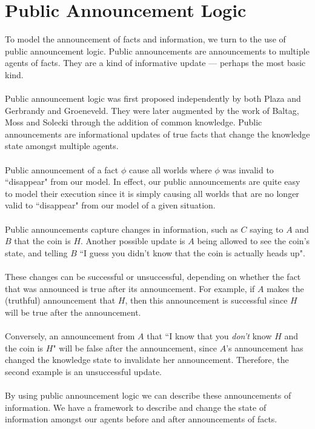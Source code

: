 \documentclass[10pt, a4paper, twoside]{article}
\begin{document}
\section{Public Announcement Logic}\label{pal}
To model the announcement of facts and information, we turn to the use of public
announcement logic.
Public announcements are announcements to multiple agents of facts.
They are a kind of informative update --- perhaps the most basic kind.\\
\\
Public announcement logic was first proposed independently by both Plaza and
Gerbrandy and Groeneveld.
They were later augmented by the work of Baltag, Moss and Solecki through the
addition of common knowledge.
Public announcements are informational updates of true facts that change the
knowledge state amongst multiple agents.\\
\\
Public announcement of a fact $\phi$ cause all worlds where $\phi$ was
invalid to ``disappear" from our model.
In effect, our public announcements are quite easy to model their execution
since it is simply causing all worlds that are no longer valid to ``disappear"
from our model of a given situation.\\
\\
Public announcements capture changes in information, such as $C$ saying to
$A$ and $B$ that the coin is $H$.
Another possible update is $A$ being allowed to see the coin's state, and
telling $B$ ``I guess you didn't know that the coin is actually heads up".\\
\\
These changes can be successful or unsuccessful, depending on whether the fact
that was announced is true after its announcement.
For example, if $A$ makes the (truthful) announcement that $H$, then this
announcement is successful since $H$ will be true after the announcement.\\
\\
Conversely, an announcement from $A$ that ``I know that you {\em don't} know $H$
and the coin is $H$" will be false after the announcement, since $A$'s
announcement has changed the knowledge state to invalidate her
announcement.
Therefore, the second example is an unsuccessful update.\\
\\
By using public announcement logic we can describe these announcements of
information.
We have a framework to describe and change the state of information amongst our
agents before and after announcements of facts.
\end{document}
